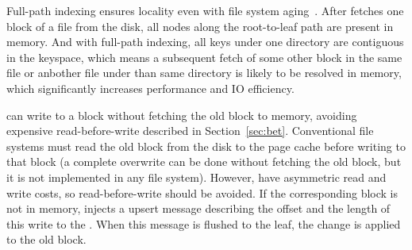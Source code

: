 Full-path indexing ensures locality even with file system aging~\citep{betrfs3}.
After \betrfs fetches one block of a file from the disk, all nodes along the
root-to-leaf path are present in memory.
And with full-path indexing, all keys under one directory are contiguous in the
keyspace, which means a subsequent fetch of some other block in the same file or
anbother file under than same directory is likely to be resolved in memory,
which significantly increases performance and IO efficiency.

\betrfs can write to a block without fetching the old block to memory, avoiding
expensive read-before-write described in Section~\ref{sec:bet}.
Conventional file systems must read the old block from the disk to the page
cache before writing to that block (a complete overwrite can be done without
fetching the old block, but it is not implemented in any file system).
However, \bets have asymmetric read and write costs, so read-before-write should
be avoided.
If the corresponding block is not in memory, \betrfs injects a upsert message
describing the offset and the length of this write to the \bet.
When this message is flushed to the leaf, the change is applied to the old
block.

